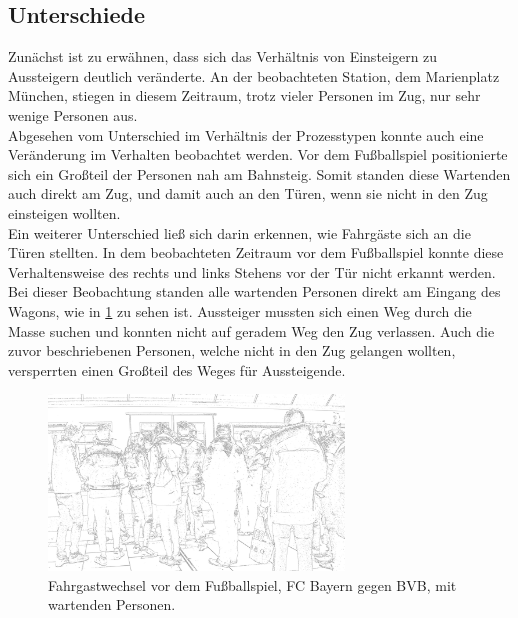 \subsection{Unterschiede}
Zunächst ist zu erwähnen, dass sich das Verhältnis von Einsteigern zu Aussteigern deutlich veränderte. An der beobachteten Station, dem Marienplatz München, stiegen in diesem Zeitraum, trotz vieler Personen im Zug, nur sehr wenige Personen aus.\\ 
Abgesehen vom Unterschied im Verhältnis der Prozesstypen konnte auch eine Veränderung im Verhalten beobachtet werden. Vor dem Fußballspiel positionierte sich ein Großteil der Personen nah am Bahnsteig. Somit standen diese Wartenden auch direkt am Zug, und damit auch an den Türen, wenn sie nicht in den Zug einsteigen wollten.\\
Ein weiterer Unterschied ließ sich darin erkennen, wie Fahrgäste sich an die Türen stellten. In dem beobachteten Zeitraum vor dem Fußballspiel konnte diese Verhaltensweise des rechts und links Stehens vor der Tür nicht erkannt werden. Bei dieser Beobachtung standen alle wartenden Personen direkt am Eingang des Wagons, wie in \figurename \ref{fig:fussballFahrgastwechsel} zu sehen ist. Aussteiger mussten sich einen Weg durch die Masse suchen und konnten nicht auf geradem Weg den Zug verlassen. Auch die zuvor beschriebenen Personen, welche nicht in den Zug gelangen wollten, versperrten einen Großteil des Weges für Aussteigende. \\
\begin{figure}[H]
	\centering
		\includegraphics[width=0.7\textwidth]{pictures/observation/football/exchange_football.png}
	\caption{Fahrgastwechsel vor dem Fußballspiel, FC Bayern gegen BVB, mit wartenden Personen.}
	\label{fig:fussballFahrgastwechsel}
\end{figure}
